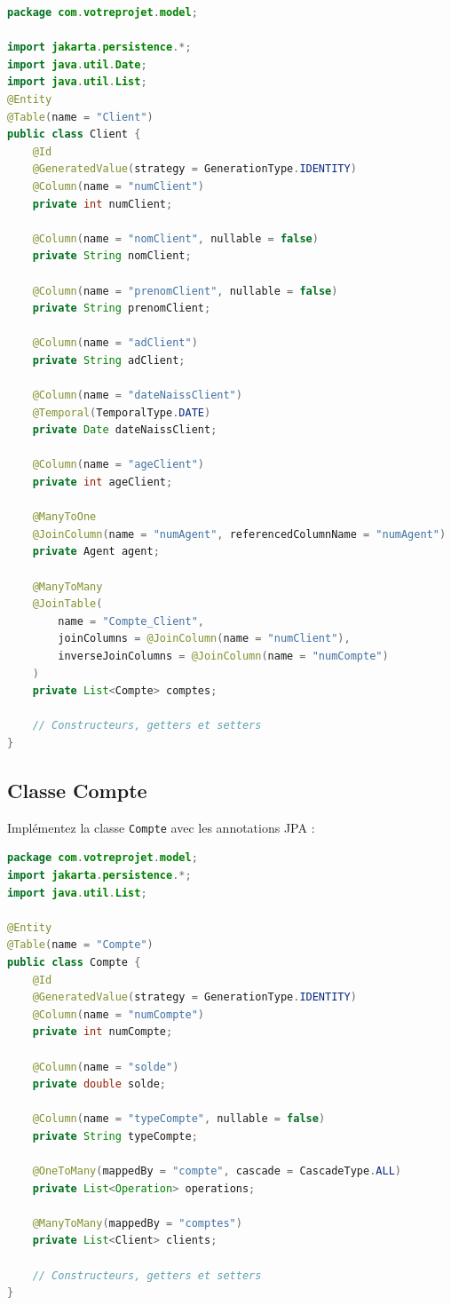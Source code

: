 \documentclass[11pt]{article}
\begin{document}
\begin{lstlisting}[language=Java]
package com.votreprojet.model;

import jakarta.persistence.*;
import java.util.Date;
import java.util.List;
@Entity
@Table(name = "Client")
public class Client {
    @Id
    @GeneratedValue(strategy = GenerationType.IDENTITY)
    @Column(name = "numClient")
    private int numClient;

    @Column(name = "nomClient", nullable = false)
    private String nomClient;

    @Column(name = "prenomClient", nullable = false)
    private String prenomClient;

    @Column(name = "adClient")
    private String adClient;

    @Column(name = "dateNaissClient")
    @Temporal(TemporalType.DATE)
    private Date dateNaissClient;

    @Column(name = "ageClient")
    private int ageClient;

    @ManyToOne
    @JoinColumn(name = "numAgent", referencedColumnName = "numAgent")
    private Agent agent;

    @ManyToMany
    @JoinTable(
        name = "Compte_Client",
        joinColumns = @JoinColumn(name = "numClient"),
        inverseJoinColumns = @JoinColumn(name = "numCompte")
    )
    private List<Compte> comptes;

    // Constructeurs, getters et setters
}
\end{lstlisting}

\subsection{Classe Compte}
Implémentez la classe \texttt{Compte} avec les annotations JPA :

\begin{lstlisting}[language=Java]
package com.votreprojet.model;
import jakarta.persistence.*;
import java.util.List;

@Entity
@Table(name = "Compte")
public class Compte {
    @Id
    @GeneratedValue(strategy = GenerationType.IDENTITY)
    @Column(name = "numCompte")
    private int numCompte;

    @Column(name = "solde")
    private double solde;

    @Column(name = "typeCompte", nullable = false)
    private String typeCompte;

    @OneToMany(mappedBy = "compte", cascade = CascadeType.ALL)
    private List<Operation> operations;

    @ManyToMany(mappedBy = "comptes")
    private List<Client> clients;

    // Constructeurs, getters et setters
}
\end{lstlisting}
\end{document}
